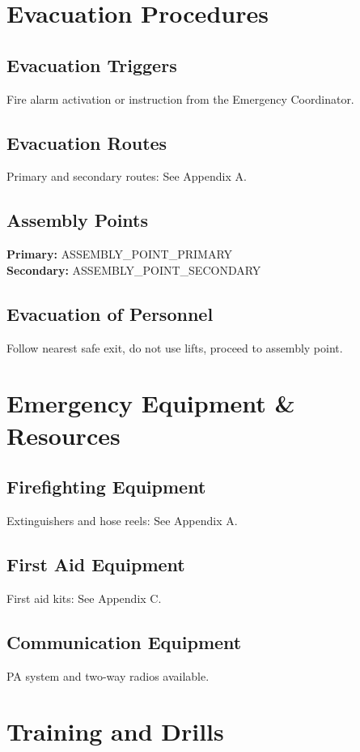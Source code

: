 \documentclass[12pt]{article}
\begin{document}
\section{Evacuation Procedures}

\subsection{Evacuation Triggers}
Fire alarm activation or instruction from the Emergency Coordinator.

\subsection{Evacuation Routes}
Primary and secondary routes: See Appendix A.

\subsection{Assembly Points}
\textbf{Primary:} {{ASSEMBLY_POINT_PRIMARY}}\\
\textbf{Secondary:} {{ASSEMBLY_POINT_SECONDARY}}

\subsection{Evacuation of Personnel}
Follow nearest safe exit, do not use lifts, proceed to assembly point.

\section{Emergency Equipment \& Resources}

\subsection{Firefighting Equipment}
Extinguishers and hose reels: See Appendix A.

\subsection{First Aid Equipment}
First aid kits: See Appendix C.

\subsection{Communication Equipment}
PA system and two-way radios available.

\section{Training and Drills}
\end{document}
